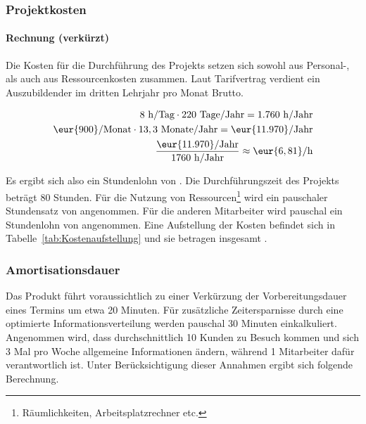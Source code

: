 \subsubsection{Projektkosten}
\label{sec:Projektkosten}

\paragraph{Rechnung (verkürzt)}
Die Kosten für die Durchführung des Projekts setzen sich sowohl aus Personal-, als auch aus Ressourcenkosten zusammen.
Laut Tarifvertrag verdient ein Auszubildender im dritten Lehrjahr pro Monat  Brutto.

\begin{eqnarray}
8 \mbox{ h/Tag} \cdot 220 \mbox{ Tage/Jahr} = 1.760 \mbox{ h/Jahr}\\
\eur{900}\mbox{/Monat} \cdot 13,3 \mbox{ Monate/Jahr} = \eur{11.970} \mbox{/Jahr}\\
\frac{\eur{11.970} \mbox{/Jahr}}{1760 \mbox{ h/Jahr}} \approx \eur{6,81}\mbox{/h}
\end{eqnarray}

Es ergibt sich also ein Stundenlohn von .
Die Durchführungszeit des Projekts beträgt 80 Stunden. Für die Nutzung von Ressourcen\footnote{Räumlichkeiten, Arbeitsplatzrechner etc.} wird
ein pauschaler Stundensatz von  angenommen. Für die anderen Mitarbeiter wird pauschal ein Stundenlohn von  angenommen.
Eine Aufstellung der Kosten befindet sich in Tabelle~\ref{tab:Kostenaufstellung} und sie betragen insgesamt .


\subsubsection{Amortisationsdauer}
\label{sec:Amortisationsdauer}
Das Produkt führt voraussichtlich zu einer Verkürzung der Vorbereitungsdauer eines Termins um etwa 20 Minuten.
Für zusätzliche Zeitersparnisse durch eine optimierte Informationsverteilung werden pauschal 30 Minuten einkalkuliert.
Angenommen wird, dass durchschnittlich 10 Kunden zu Besuch kommen und sich 3 Mal pro Woche allgemeine Informationen ändern, während 1 Mitarbeiter dafür verantwortlich ist.
Unter Berücksichtigung dieser Annahmen ergibt sich folgende Berechnung.

